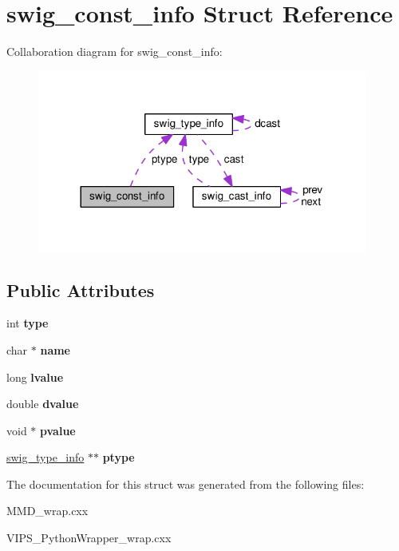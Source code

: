 \hypertarget{structswig__const__info}{}\section{swig\+\_\+const\+\_\+info Struct Reference}
\label{structswig__const__info}


Collaboration diagram for swig\+\_\+const\+\_\+info\+:\nopagebreak
\begin{figure}[H]
\begin{center}
\leavevmode
\includegraphics[width=308pt]{structswig__const__info__coll__graph}
\end{center}
\end{figure}
\subsection*{Public Attributes}
\begin{DoxyCompactItemize}
\item 
int {\bfseries type}\hypertarget{structswig__const__info_ae8bbc99e1cda11f24e306365cbf33893}{}\label{structswig__const__info_ae8bbc99e1cda11f24e306365cbf33893}

\item 
char $\ast$ {\bfseries name}\hypertarget{structswig__const__info_adb8a1bc6fcbfb39737a9dc72dfabf8f1}{}\label{structswig__const__info_adb8a1bc6fcbfb39737a9dc72dfabf8f1}

\item 
long {\bfseries lvalue}\hypertarget{structswig__const__info_af142e4c21ad4fe61f6c2624bff034583}{}\label{structswig__const__info_af142e4c21ad4fe61f6c2624bff034583}

\item 
double {\bfseries dvalue}\hypertarget{structswig__const__info_a74e477f1dbf515bcb7e2ef07a1d34c35}{}\label{structswig__const__info_a74e477f1dbf515bcb7e2ef07a1d34c35}

\item 
void $\ast$ {\bfseries pvalue}\hypertarget{structswig__const__info_a37585059046a4951907eb779c97e7cc8}{}\label{structswig__const__info_a37585059046a4951907eb779c97e7cc8}

\item 
\hyperlink{structswig__type__info}{swig\+\_\+type\+\_\+info} $\ast$$\ast$ {\bfseries ptype}\hypertarget{structswig__const__info_a374efde326bb281d91791c91306e3f08}{}\label{structswig__const__info_a374efde326bb281d91791c91306e3f08}

\end{DoxyCompactItemize}


The documentation for this struct was generated from the following files\+:\begin{DoxyCompactItemize}
\item 
M\+M\+D\+\_\+wrap.\+cxx\item 
V\+I\+P\+S\+\_\+\+Python\+Wrapper\+\_\+wrap.\+cxx\end{DoxyCompactItemize}
